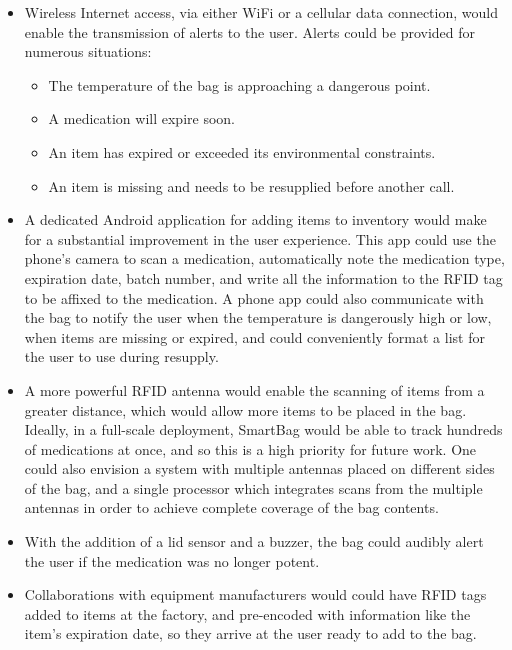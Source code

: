 \documentclass{sigchi}
\begin{document}
\begin{itemize}
\item Wireless Internet access, via either WiFi or a cellular data connection,
	would enable the transmission of alerts to the user. Alerts could be provided
	for numerous situations: 
	\begin{itemize}
	\item The temperature of the bag is approaching a dangerous point. 
	\item A medication will expire soon. 
	\item An item has expired or exceeded its environmental constraints. 
	\item An item is missing and needs to be resupplied before another call.
	\end{itemize}

\item A dedicated Android application for adding items to inventory would make
	for a substantial improvement in the user experience. This app could use the phone’s
	camera to scan a medication, automatically note the medication type, expiration date,
	batch number, and write all the information to the RFID tag to be affixed to the
	medication. A phone app could also communicate with the bag to notify the
    user when the temperature is dangerously high or low, when items are missing
    or expired, and could conveniently format a list for the user to use during
    resupply.

\item A more powerful RFID antenna would enable the scanning of items from a greater
	distance, which would allow more items to be placed in the bag. Ideally, in a
    full-scale deployment, SmartBag would be able to track hundreds of medications
    at once, and so this is a high priority for future work. One could also envision
    a system with multiple antennas placed on different sides of the bag, and a
    single processor which integrates scans from the multiple antennas in order
    to achieve complete coverage of the bag contents.

\item With the addition of a lid sensor and a buzzer, the bag could audibly alert
	the user if the medication was no longer potent.
    
\item Collaborations with equipment manufacturers would could have RFID tags added
	to 	items at the factory, and pre-encoded with information like the item's
    expiration date, so they arrive at the user ready to add to the bag.
\end{itemize}
\end{document}

